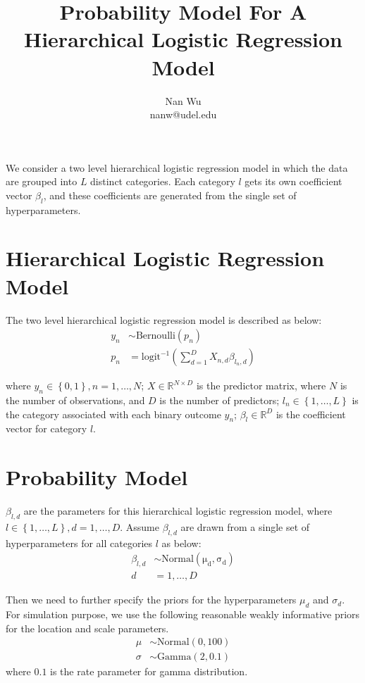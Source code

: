 \documentclass[12pt]{article}
\def\eqa{\left(\sum \limits_{d=1}^D X_{n,d}\beta_{l_n,d} \right)}
\begin{document}
\title{Probability Model For A Hierarchical Logistic Regression Model}
\author{Nan Wu \\ nanw@udel.edu}
\date{}
\maketitle

We consider a two level hierarchical logistic regression model in which the data are grouped into $L$ distinct categories. Each category $l$ gets its own coefficient vector $\beta_l$, and these coefficients are generated from the single set of hyperparameters.

\section{Hierarchical Logistic Regression Model}

The two level hierarchical logistic regression model is described as below:
\begin{align*}
  y_n &\sim \mathrm{Bernoulli}\left(p_n\right) \\
  p_n &= \mathrm{logit}^{-1}\eqa
\end{align*}

where $y_n \in \left \{0,1 \right\}, n=1,\ldots,N$; $X\in \mathbb{R}^{N \times D}$ is the predictor matrix, where $N$ is the number of observations, and $D$ is the number of predictors; $l_n\in \left\{1,\ldots,L \right\}$ is the category associated with each binary outcome $y_n$; $\beta_l \in \mathbb{R}^D$ is the coefficient vector for category $l$.

\section{Probability Model}

$\beta_{l,d}$ are the parameters for this hierarchical logistic regression model, where $l\in\left\{1,\ldots,L\right\}, d=1,\ldots,D$. Assume $\beta_{l,d}$ are drawn from a single set of hyperparameters for all categories $l$ as below:
\begin{align*}
  \beta_{l,d} &\sim \mathrm{Normal\left(\mu_d, \sigma_d \right)}\\
  d &= 1, \ldots, D
\end{align*}

Then we need to further specify the priors for the hyperparameters $\mu_d$ and $\sigma_d$. For simulation purpose, we use the following reasonable weakly informative priors for the location and scale parameters.
\begin{align*}
  \mu &\sim \mathrm{Normal}\left(0, 100 \right) \\
  \sigma &\sim \mathrm{Gamma}\left(2, 0.1\right)
\end{align*}
where $0.1$ is the rate parameter for gamma distribution.
\end{document}
